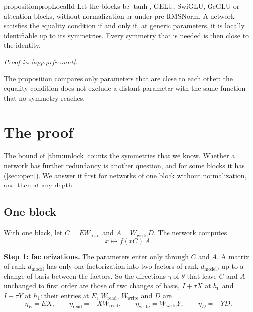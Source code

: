 \documentclass[10pt]{article}
\theoremstyle{definition}
\theoremstyle{remark}
\newcommand{\Wread}{W_{\mathrm{read}}}
\newcommand{\Wwrite}{W_{\mathrm{write}}}
\newcommand{\dm}{d_{\mathrm{model}}}
\newcommand{\para}[1]{\smallskip\noindent\textbf{#1}\hspace{0.5em}}
\newcommand{\proofin}[1]{\par\vspace{-0.4\baselineskip}\noindent\hfill{\small\itshape Proof in \cref{#1}.}\par\smallskip}
\begin{document}
\begin{restatable}{proposition}{propLocalId}\label{prop:localid}
Let the blocks be $\tanh$, GELU, SwiGLU, GeGLU or attention blocks, without normalization or under pre-RMSNorm. A network satisfies the equality condition if and only if, at generic parameters, it is locally identifiable up to its symmetries. Every symmetry that is needed is then close to the identity.
\end{restatable}
\proofin{app:prf-count}

The proposition compares only parameters that are close to each other: the equality condition does not exclude a distant parameter with the same function that no symmetry reaches.

\section{The proof}\label{sec:theproof}

The bound of \cref{thm:unlock} counts the symmetries that we know. Whether a network has further redundancy is another question, and for some blocks it has (\cref{sec:open}). We answer it first for networks of one block without normalization, and then at any depth.

\subsection{One block}\label{sec:oneblock}

With one block, let $C = E\Wread$ and $A = \Wwrite D$. The network computes
\begin{equation}\label{eq:oneblock}
x \mapsto f(xC)\,A .
\end{equation}

\para{Step 1: factorizations.} The parameters enter only through $C$ and $A$. A matrix of rank $\dm$ has only one factorization into two factors of rank $\dm$, up to a change of basis between the factors. So the directions $\eta$ of $\theta$ that leave $C$ and $A$ unchanged to first order are those of two changes of basis, $I + \tau X$ at $h_0$ and $I + \tau Y$ at $h_1$: their entries at $E$, $\Wread$, $\Wwrite$ and $D$ are
\[
\eta_E = EX, \qquad \eta_{\mathrm{read}} = -X\Wread, \qquad \eta_{\mathrm{write}} = \Wwrite Y, \qquad \eta_D = -YD .
\]
\end{document}

